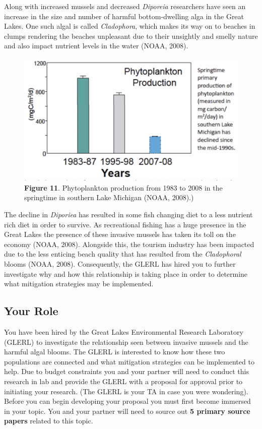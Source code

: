 \documentclass[
]{book}
\begin{document}
Along with increased mussels and decreased \emph{Diporeia} researchers have seen an increase in the size and number of harmful bottom-dwelling alga in the Great Lakes. One such algal is called \emph{Cladophora}, which makes its way on to beaches in clumps rendering the beaches unpleasant due to their unsightly and smelly nature and also impact nutrient levels in the water (NOAA, 2008).

\begin{figure}
\centering
\includegraphics{images/figure11.png}
\caption{\textbf{Figure 11}. Phytoplankton production from 1983 to 2008 in the springtime in southern Lake Michigan (NOAA, 2008).)}
\end{figure}

The decline in \emph{Diporiea} has resulted in some fish changing diet to a less nutrient rich diet in order to survive. As recreational fishing has a huge presence in the Great Lakes the presence of these invasive mussels has taken its toll on the economy (NOAA, 2008). Alongside this, the tourism industry has been impacted due to the less enticing beach quality that has resulted from the \emph{Cladophoral} blooms (NOAA, 2008). Consequently, the GLERL has hired you to further investigate why and how this relationship is taking place in order to determine what mitigation strategies may be implemented.

\hypertarget{your-role-2}{%
\subsection*{Your Role}\label{your-role-2}}

You have been hired by the Great Lakes Environmental Research Laboratory (GLERL) to investigate the relationship seen between invasive mussels and the harmful algal blooms. The GLERL is interested to know how these two populations are connected and what mitigation strategies can be implemented to help. Due to budget constraints you and your partner will need to conduct this research in lab and provide the GLERL with a proposal for approval prior to initiating your research. (The GLERL is your TA in case you were wondering). Before you can begin developing your proposal you must first become immersed in your topic. You and your partner will need to source out \textbf{5 primary source papers} related to this topic.
\end{document}
